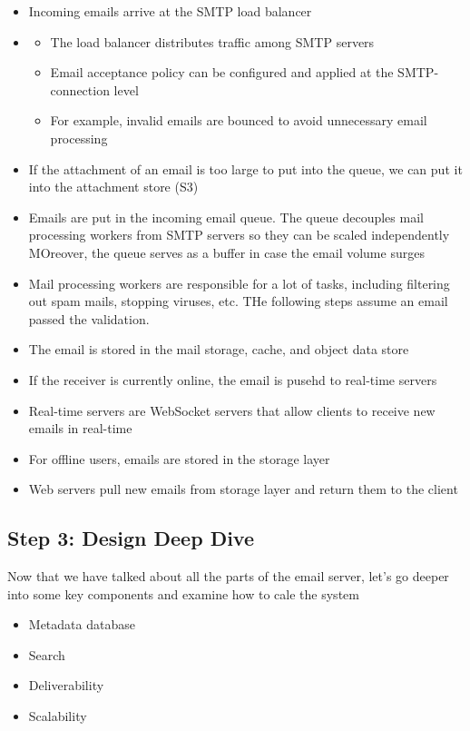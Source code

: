 \documentclass{report}
\theoremstyle{definition}
\let\oldsubsection\subsection
\renewcommand{\subsection}{\oldsubsection*}
\begin{document}
\begin{itemize}
\item
Incoming emails arrive at the SMTP load balancer
\item

\begin{itemize}
\item
The load balancer distributes traffic among SMTP servers
\item
Email acceptance policy can be configured and applied at the SMTP-connection level
\item
For example, invalid emails are bounced to avoid unnecessary email processing
\end{itemize}

\item
If the attachment of an email is too large to put into the queue, we can put it into the attachment store (S3)
\item
Emails are put in the incoming email queue. The queue decouples mail processing workers from SMTP servers so they can be scaled independently MOreover, the queue serves as a buffer in case the email volume surges
\item
Mail processing workers are responsible for a lot of tasks, including filtering out spam mails, stopping viruses, etc. THe following steps assume an email passed the validation.
\item
The email is stored in the mail storage, cache, and object data store
\item
If the receiver is currently online, the email is pusehd to real-time servers
\item
Real-time servers are WebSocket servers that allow clients to receive new emails in real-time
\item
For offline users, emails are stored in the storage layer
\item
Web servers pull new emails from storage layer and return them to the client
\end{itemize}

\subsection{Step 3: Design Deep Dive}

Now that we have talked about all the parts of the email server, let's go deeper into some key components and examine how to cale the system

\begin{itemize}
\item
Metadata database
\item
Search
\item
Deliverability
\item
Scalability
\end{itemize}
\end{document}
